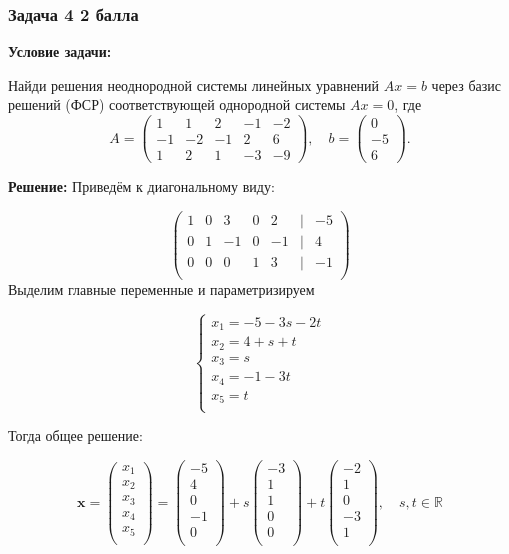 \documentclass[a4paper,12pt]{article}
\begin{document}
\subsubsection{Задача 4 \hfill 2 балла}
\textbf{Условие задачи:}

Найди решения неоднородной системы линейных уравнений \( Ax = b \) через базис решений (ФСР) соответствующей однородной системы \( Ax = 0 \), где
\[
A =
\begin{pmatrix}
1 & 1 & 2 & -1 & -2 \\
-1 & -2 & -1 & 2 & 6 \\
1 & 2 & 1 & -3 & -9
\end{pmatrix},
\quad
b =
\begin{pmatrix}
0 \\
-5 \\
6
\end{pmatrix}.
\]

\textbf{Решение:}
Приведём к диагональному виду: 

\[
\begin{pmatrix}
    1 & 0 & 3 & 0 & 2 & | & -5 \\
    0 & 1 & -1 & 0 & -1 & | & 4 \\ 
    0 & 0 & 0 & 1 & 3 & | & -1 \\
\end{pmatrix}
\]
Выделим главные переменные и параметризируем

\[
\begin{cases}
x_1 = -5 -3s -2t  \\
x_2 = 4 + s + t\\
x_3 = s \\
x_4 = -1 -3t \\
x_5 = t \\
\end{cases}
\]

Тогда общее решение: 

\[
\mathbf{x} =
\begin{pmatrix}
x_1 \\
x_2 \\
x_3 \\
x_4 \\
x_5 \\
\end{pmatrix}
=
\begin{pmatrix}
-5 \\
4 \\
0 \\
-1 \\
0 \\
\end{pmatrix}
+ s
\begin{pmatrix}
-3 \\
1 \\
1 \\
0 \\
0 \\
\end{pmatrix}
+ t
\begin{pmatrix}
-2 \\
1 \\
0 \\
-3 \\
1 \\
\end{pmatrix}, \quad s, t \in \mathbb{R}
\]
\end{document}
